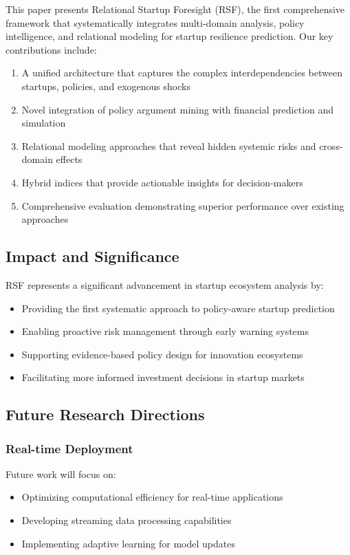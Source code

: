 \documentclass[conference]{IEEEtran}
\begin{document}
This paper presents Relational Startup Foresight (RSF), the first comprehensive framework that systematically integrates multi-domain analysis, policy intelligence, and relational modeling for startup resilience prediction. Our key contributions include:

\begin{enumerate}
    \item A unified architecture that captures the complex interdependencies between startups, policies, and exogenous shocks
    \item Novel integration of policy argument mining with financial prediction and simulation
    \item Relational modeling approaches that reveal hidden systemic risks and cross-domain effects
    \item Hybrid indices that provide actionable insights for decision-makers
    \item Comprehensive evaluation demonstrating superior performance over existing approaches
\end{enumerate}

\subsection{Impact and Significance}

RSF represents a significant advancement in startup ecosystem analysis by:
\begin{itemize}
    \item Providing the first systematic approach to policy-aware startup prediction
    \item Enabling proactive risk management through early warning systems
    \item Supporting evidence-based policy design for innovation ecosystems
    \item Facilitating more informed investment decisions in startup markets
\end{itemize}

\subsection{Future Research Directions}

\subsubsection{Real-time Deployment}
Future work will focus on:
\begin{itemize}
    \item Optimizing computational efficiency for real-time applications
    \item Developing streaming data processing capabilities
    \item Implementing adaptive learning for model updates
\end{itemize}
\end{document}
